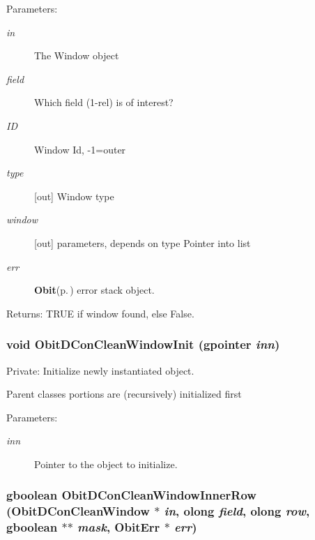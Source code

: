 \begin{Desc}
\item[Parameters:]
\begin{description}
\item[{\em in}]The Window object \item[{\em field}]Which field (1-rel) is of interest? \item[{\em ID}]Window Id, -1=outer \item[{\em type}][out] Window type \item[{\em window}][out] parameters, depends on type Pointer into list \item[{\em err}]{\bf Obit}{\rm (p.\,\pageref{structObit})} error stack object. \end{description}
\end{Desc}
\begin{Desc}
\item[Returns:]TRUE if window found, else False. \end{Desc}
\subsubsection{\setlength{\rightskip}{0pt plus 5cm}void Obit\-DCon\-Clean\-Window\-Init (gpointer {\em inn})}\label{ObitDConCleanWindow_8c_a4}


Private: Initialize newly instantiated object. 

Parent classes portions are (recursively) initialized first \begin{Desc}
\item[Parameters:]
\begin{description}
\item[{\em inn}]Pointer to the object to initialize. \end{description}
\end{Desc}
\subsubsection{\setlength{\rightskip}{0pt plus 5cm}gboolean Obit\-DCon\-Clean\-Window\-Inner\-Row ({\bf Obit\-DCon\-Clean\-Window} $\ast$ {\em in}, {\bf olong} {\em field}, {\bf olong} {\em row}, gboolean $\ast$$\ast$ {\em mask}, {\bf Obit\-Err} $\ast$ {\em err})}\label{ObitDConCleanWindow_8c_a25}



